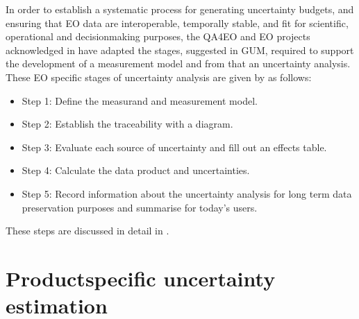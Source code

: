 \documentclass[a4paper,10pt,english]{sphinxmanual}
\begin{document}
\sphinxAtStartPar
In order to establish a systematic process for generating uncertainty budgets, and ensuring that EO data are interoperable, temporally stable, and fit for scientific, operational and decision\sphinxhyphen{}making purposes, the QA4EO and EO projects acknowledged in {\hyperref[\detokenize{04_uncertainty_analysis:ref-qa4eo3}]{}} have adapted the stages, suggested in GUM, required to support the development of a measurement model and from that an uncertainty analysis. These EO specific stages of uncertainty analysis are given by {\hyperref[\detokenize{04_uncertainty_analysis:ref-qa4eo3}]{}} as follows:
\begin{itemize}
\item {} 
\sphinxAtStartPar
Step 1: Define the measurand and measurement model.

\item {} 
\sphinxAtStartPar
Step 2: Establish the traceability with a diagram.

\item {} 
\sphinxAtStartPar
Step 3: Evaluate each source of uncertainty and fill out an effects table.

\item {} 
\sphinxAtStartPar
Step 4: Calculate the data product and uncertainties.

\item {} 
\sphinxAtStartPar
Step 5: Record information about the uncertainty analysis for long term data preservation purposes and summarise for today’s users.

\end{itemize}

\sphinxAtStartPar
These steps are discussed in detail in {\hyperref[\detokenize{04_uncertainty_analysis:ref-qa4eo3}]{}}.


\section{Product\sphinxhyphen{}specific uncertainty estimation}
\label{\detokenize{04_uncertainty_analysis:product-specific-uncertainty-estimation}}
\end{document}
